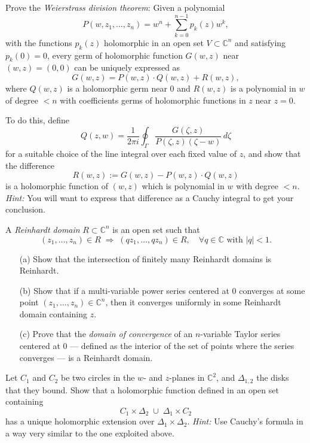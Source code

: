 \documentclass[12pt]{article}  %
\begin{document}
\begin{problem}{4}
Prove the \emph{Weierstrass division theorem}:  
Given a polynomial 
\[
P(w,z_1,\dots,z_n) = w^n + \sum_{k=0}^{n-1} p_k(z) w^k,
\] 
with the functions $p_k(z)$ holomorphic in an open set $V \subset \mathbb{C}^n$ and satisfying $p_k(0)=0$, every germ of holomorphic function $G(w,z)$ near $(w,z)=(0,0)$ can be uniquely expressed as
\[
G(w,z) = P(w,z)\cdot Q(w,z) + R(w,z),
\]
where $Q(w,z)$ is a holomorphic germ near $0$ and $R(w,z)$ is a polynomial in $w$ of degree $< n$ with coefficients germs of holomorphic functions in $z$ near $z=0$.

To do this, define
\[
Q(z,w) = \frac{1}{2\pi i} \oint_\Gamma \frac{G(\zeta, z)}{P(\zeta, z)(\zeta - w)} \, d\zeta
\]
for a suitable choice of the line integral over each fixed value of $z$, and show that the difference
\[
R(w,z) := G(w,z) - P(w,z)\cdot Q(w,z)
\]
is a holomorphic function of $(w,z)$ which is polynomial in $w$ with degree $< n$.  
\emph{Hint:} You will want to express that difference as a Cauchy integral to get your conclusion.
\end{problem}

\begin{problem}{5}
A \emph{Reinhardt domain} $R \subset \mathbb{C}^n$ is an open set such that
\[
(z_1,\dots,z_n)\in R \;\Rightarrow\; (qz_1,\dots,qz_n)\in R,\quad \forall q\in\mathbb{C} \text{ with } |q|<1.
\]

\begin{enumerate}
\item[(a)] Show that the intersection of finitely many Reinhardt domains is Reinhardt.  
\item[(b)] Show that if a multi-variable power series centered at $0$ converges at some point 
$(z_1,\dots,z_n)\in \mathbb{C}^n$, then it converges uniformly in some Reinhardt domain containing $z$.  
\item[(c)] Prove that the \emph{domain of convergence} of an $n$-variable Taylor series centered at $0$ --- defined as the interior of the set of points where the series converges --- is a Reinhardt domain.
\end{enumerate}
\end{problem}

\begin{problem}{6}
Let $C_1$ and $C_2$ be two circles in the $w$- and $z$-planes in $\mathbb{C}^2$, and $\Delta_{1,2}$ the disks that they bound. Show that a holomorphic function defined in an open set containing 
\[
C_1 \times \Delta_2 \;\cup\; \Delta_1 \times C_2
\]
has a unique holomorphic extension over $\Delta_1 \times \Delta_2$.  
\emph{Hint:} Use Cauchy's formula in a way very similar to the one exploited above.
\end{problem}
\end{document}
